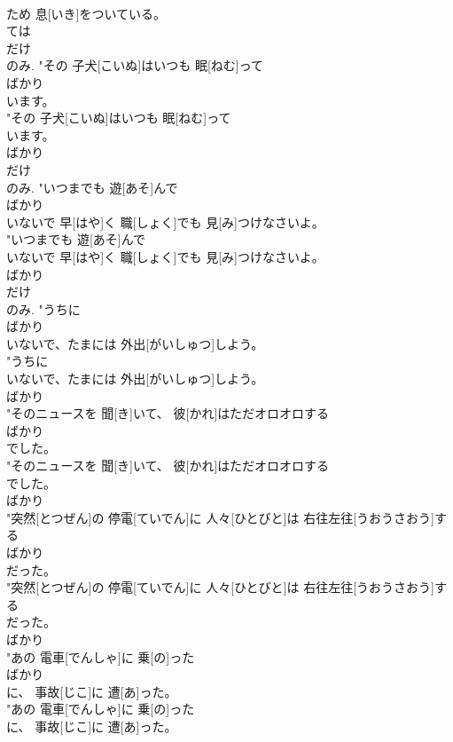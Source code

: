 \documentclass[8pt]{extreport}
\begin{document}
\begin{CJK}{UTF8}{min}
\\	ため 息[いき]をついている。
\\	ては
\\	だけ 
\\	のみ.	"その 子犬[こいぬ]はいつも 眠[ねむ]って
\\	ばかり
\\	います。
\\	"その 子犬[こいぬ]はいつも 眠[ねむ]って
\\	います。
\\	ばかり
\\	だけ 
\\	のみ.	"いつまでも 遊[あそ]んで
\\	ばかり
\\	いないで 早[はや]く 職[しょく]でも 見[み]つけなさいよ。
\\	"いつまでも 遊[あそ]んで
\\	いないで 早[はや]く 職[しょく]でも 見[み]つけなさいよ。
\\	ばかり
\\	だけ 
\\	のみ.	"うちに
\\	ばかり
\\	いないで、たまには 外出[がいしゅつ]しよう。
\\	"うちに
\\	いないで、たまには 外出[がいしゅつ]しよう。
\\	ばかり
\\	"そのニュースを 聞[き]いて、 彼[かれ]はただオロオロする
\\	ばかり
\\	でした。
\\	"そのニュースを 聞[き]いて、 彼[かれ]はただオロオロする
\\	でした。
\\	ばかり
\\	"突然[とつぜん]の 停電[ていでん]に 人々[ひとびと]は 右往左往[うおうさおう]する
\\	ばかり
\\	だった。
\\	"突然[とつぜん]の 停電[ていでん]に 人々[ひとびと]は 右往左往[うおうさおう]する
\\	だった。
\\	ばかり
\\	"あの 電車[でんしゃ]に 乗[の]った
\\	ばかり
\\	に、 事故[じこ]に 遭[あ]った。
\\	"あの 電車[でんしゃ]に 乗[の]った
\\	に、 事故[じこ]に 遭[あ]った。

\end{CJK}
\end{document}

